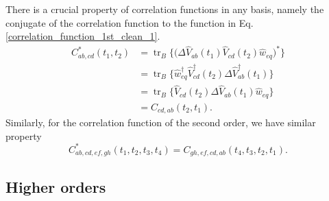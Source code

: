 There is a crucial property of correlation functions in any basis, namely the conjugate of the correlation function to the function in Eq. \ref{correlation_function_1st_clean_1}.
\begin{equation}
\label{corr_fun_1st_prop}
    \begin{aligned}
        C_{ab,cd}^*(t_1, t_2) &= \operatorname{tr}_B \big\{ \big(\Delta \hat{V}_{ab}(t_1) \hat{V}_{cd}(t_2) \hat{w}_{eq} \big)^*\big\} \\
        &= \operatorname{tr}_B \big\{ \hat{w}_{eq}^\dagger \hat{V}_{cd}^\dagger(t_2) \Delta \hat{V}_{ab}^\dagger(t_1) \big\} \\
        &= \operatorname{tr}_B \big\{ \hat{V}_{cd}(t_2) \Delta \hat{V}_{ab}(t_1) \hat{w}_{eq} \big\} \\
        &= C_{cd,ab}(t_2, t_1).
    \end{aligned}
\end{equation}
Similarly, for the correlation function of the second order, we have similar property
\begin{equation}
\label{corr_fun_2nd_prop}
    C_{ab,cd,ef,gh}^*(t_1, t_2, t_3, t_4) = C_{gh,ef,cd,ab}(t_4, t_3, t_2, t_1).
\end{equation}

\subsection{Higher orders}
\label{Higher orders}

